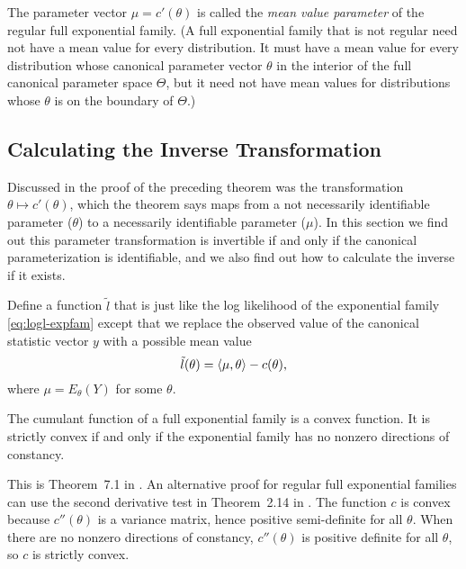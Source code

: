 The parameter vector $\mu = c'(\theta)$ is called
the \emph{mean value parameter} of the regular full exponential family.
(A full exponential family that is not regular need not have a mean
value for every distribution.  It must have a mean value for every
distribution whose canonical parameter vector $\theta$ in the interior
of the full canonical parameter space $\Theta$,
but it need not have mean values for distributions whose $\theta$ is
on the boundary of $\Theta$.)

\subsection{Calculating the Inverse Transformation}
\label{sec:calculating-inverse-transformation}

Discussed in the proof of the preceding theorem was the transformation
$\theta \mapsto c'(\theta)$, which the theorem says maps from a not
necessarily identifiable parameter ($\theta$) to a necessarily identifiable
parameter ($\mu$).  In this section we find out this parameter transformation
is invertible if and only if the canonical parameterization is identifiable,
and we also find out how to calculate the inverse if it exists.

Define a function $\tilde{l}$ that is just like the log likelihood
of the exponential family \eqref{eq:logl-expfam} except that we replace
the observed value of the canonical statistic vector $y$ with a possible
mean value
\begin{equation} \label{eq:logl-expfam-expected}
   \tilde{l}(\theta) = \langle \mu, \theta \rangle - c(\theta),
\end{equation}
where $\mu = E_\theta(Y)$ for some $\theta$.

\begin{lemma}
The cumulant function of a full exponential family is a convex function.
It is strictly convex if and only if the exponential family has no
nonzero directions of constancy.
\end{lemma}
This is Theorem~{7.1} in \citet{barndorff-nielsen}.
An alternative proof for regular full exponential families can
use the second derivative test in Theorem~{2.14} in \citet{rockafellar-wets}.
The function $c$ is convex because $c''(\theta)$ is a variance matrix,
hence positive semi-definite for all $\theta$.
When there are no nonzero directions of constancy,
$c''(\theta)$ is positive definite for all $\theta$,
so $c$ is strictly convex.

